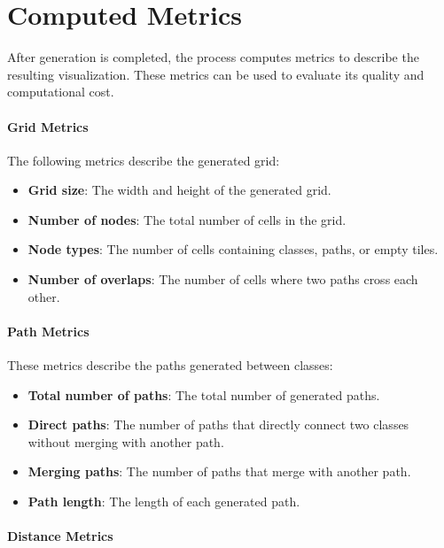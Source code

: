 \documentclass[../../main.tex]{subfiles}
\begin{document}
\section{Computed Metrics}

After generation is completed, the process computes metrics to describe the resulting visualization. These metrics can be used to evaluate its quality and computational cost.

\paragraph{Grid Metrics}

The following metrics describe the generated grid:

\begin{itemize}
    \item \textbf{Grid size}: The width and height of the generated grid.
    \item \textbf{Number of nodes}: The total number of cells in the grid.
    \item \textbf{Node types}: The number of cells containing classes, paths, or empty tiles.
    \item \textbf{Number of overlaps}: The number of cells where two paths cross each other.
\end{itemize}

\paragraph{Path Metrics}

These metrics describe the paths generated between classes:

\begin{itemize}
    \item \textbf{Total number of paths}: The total number of generated paths.
    \item \textbf{Direct paths}: The number of paths that directly connect two classes without merging with another path.
    \item \textbf{Merging paths}: The number of paths that merge with another path.
    \item \textbf{Path length}: The length of each generated path.
\end{itemize}

\paragraph{Distance Metrics}
\end{document}
